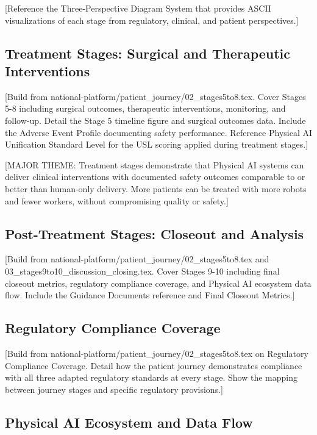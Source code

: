 [Reference the Three-Perspective Diagram System that provides ASCII
visualizations of each stage from regulatory, clinical, and patient
perspectives.]

\subsection{Treatment Stages: Surgical and Therapeutic Interventions}
\label{subsec:journey-treatment}

[Build from national-platform/patient\_journey/02\_stages5to8.tex. Cover
Stages 5-8 including surgical outcomes, therapeutic interventions, monitoring,
and follow-up. Detail the Stage 5 timeline figure and surgical outcomes data.
Include the Adverse Event Profile documenting safety performance. Reference
Physical AI Unification Standard Level \cite{usl-standard} for the USL
scoring applied during treatment stages.]

[MAJOR THEME: Treatment stages demonstrate that Physical AI systems can
deliver clinical interventions with documented safety outcomes comparable to
or better than human-only delivery. More patients can be treated with more
robots and fewer workers, without compromising quality or safety.]

\subsection{Post-Treatment Stages: Closeout and Analysis}
\label{subsec:journey-closeout}

[Build from national-platform/patient\_journey/02\_stages5to8.tex and
03\_stages9to10\_discussion\_closing.tex. Cover Stages 9-10 including final
closeout metrics, regulatory compliance coverage, and Physical AI ecosystem
data flow. Include the Guidance Documents reference and Final Closeout
Metrics.]

\subsection{Regulatory Compliance Coverage}
\label{subsec:journey-compliance}

[Build from national-platform/patient\_journey/02\_stages5to8.tex on
Regulatory Compliance Coverage. Detail how the patient journey demonstrates
compliance with all three adapted regulatory standards at every stage. Show
the mapping between journey stages and specific regulatory provisions.]

\subsection{Physical AI Ecosystem and Data Flow}
\label{subsec:journey-ecosystem}

